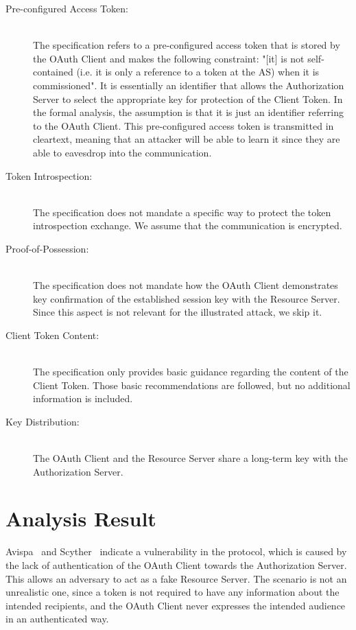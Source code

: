 \documentclass[peerreview, a4paper, 7pt]{IEEEtran}
\begin{document}
\begin{description}
	\item[Pre-configured Access Token:] \hfill \\ The specification refers to a pre-configured access token that is stored by the OAuth Client and makes the following constraint: "[it] is not self-contained (i.e. it is only a reference to a token at the AS) when it is commissioned". It is essentially an identifier that allows the Authorization Server to select the appropriate key for protection of the Client Token. In the formal analysis, the assumption is that it is just an identifier referring to the OAuth Client. This pre-configured access token is transmitted in cleartext, meaning that an attacker will be able to learn it since they are able to eavesdrop into the communication. \\
	\item[Token Introspection:] \hfill \\ The specification does not mandate a specific way to protect the token introspection exchange. We assume that the communication is encrypted. \\
	\item[Proof-of-Possession:] \hfill \\ The specification does not mandate how the OAuth Client demonstrates key confirmation of the established session key with the Resource Server. Since this aspect is not relevant for the illustrated attack, we skip it. \\
	\item[Client Token Content:] \hfill \\ The specification only provides basic guidance regarding the content of the Client Token. Those basic recommendations are followed, but no additional information is included. \\ 
	\item[Key Distribution:] \hfill \\ The OAuth Client and the Resource Server share a long-term key with the Authorization Server. 
\end{description}


\section{Analysis Result}

Avispa~\cite{Avispa} and Scyther~\cite{Scyther} indicate a vulnerability in the protocol, which is caused by the lack of authentication of the OAuth Client towards the Authorization Server. This allows an adversary to act as a fake Resource Server. The scenario is not an unrealistic one, since a token is not required to have any information about the intended recipients, and the OAuth Client never expresses the intended audience in an authenticated way.
\end{document}
